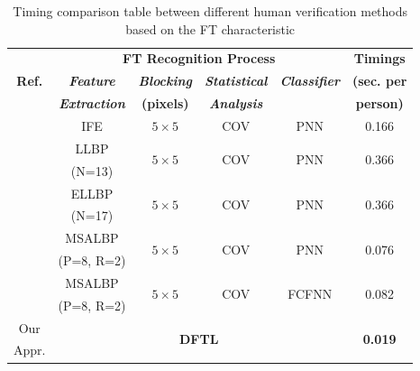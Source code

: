 \documentclass[conference]{IEEEtran}
\begin{document}
\begin{table}[]
\centering
\caption{Timing comparison table between different human verification methods based on the FT characteristic}
\label{Table:timing}
\begin{tabular}{|c|c|c|c|c|c|}
\hline
\multirow{3}{*}{\textbf{Ref.}} & \multicolumn{4}{c|}{\textbf{FT Recognition Process}} & \textbf{Timings} \\ \cline{2-5}
& \textbf{\textit{Feature}} &  \textbf{\textit{Blocking}} & \textbf{\textit{Statistical}} & \textbf{\textit{Classifier}} & \textbf{(sec. per}   \\ 
 & \textbf{\textit{Extraction}} & \textbf{(pixels)}&  \textbf{\textit{Analysis}} & & \textbf{person)}  \\ \hline
\cite{Al-Nima2015Human} &  IFE & $5 \times 5$ & COV & PNN & 0.166\\ \hline
\multirow{2}{*}{\cite{Al-Nima2017efficient}} & LLBP \cite{Petpon2009Face}  & \multirow{2}{*}{$5 \times 5$} & \multirow{2}{*}{COV} & \multirow{2}{*}{PNN} & \multirow{2}{*}{0.366}\\ 
& (N=13) & & & &\\ \hline
\multirow{2}{*}{\cite{Al-Nima2017Robust}}  & ELLBP  & \multirow{2}{*}{$5 \times 5$} & \multirow{2}{*}{COV} & \multirow{2}{*}{PNN} & \multirow{2}{*}{0.366}\\ 
& (N=17)  & & & &\\ \hline
\multirow{2}{*}{\cite{Al-Nima2017finger}} & MSALBP& \multirow{2}{*}{$5 \times 5$} & \multirow{2}{*}{COV} & \multirow{2}{*}{PNN} &\multirow{2}{*}{0.076}\\ 
 & (P=8, R=2)  & & & &\\ \hline
\multirow{2}{*}{\cite{Al-Nima2017finger}} & MSALBP  & \multirow{2}{*}{$5 \times 5$} & \multirow{2}{*}{COV} & \multirow{2}{*}{FCFNN} & \multirow{2}{*}{0.082}\\ 
 & (P=8, R=2)  & & & &\\ \hline
Our & \multicolumn{4}{c|}{\multirow{2}{*}{\textbf{DFTL}}}  & \multirow{2}{*}{\textbf{0.019}} \\ 
Appr. & \multicolumn{4}{c|}{}  & \\ \hline
\end{tabular}
\end{table}

\end{document}
